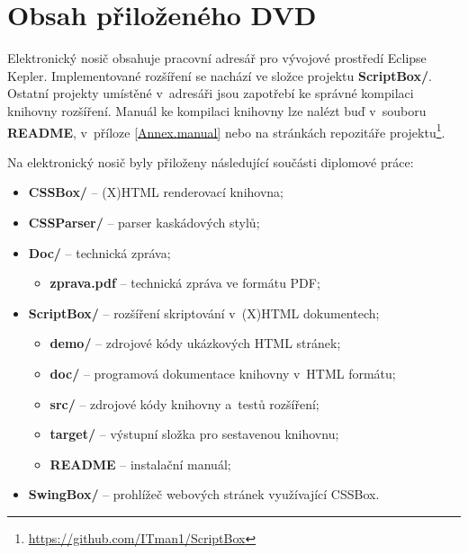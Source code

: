 
\chapter{Obsah přiloženého DVD}
\label{Annex.dvdContent}


Elektronický nosič obsahuje pracovní adresář pro vývojové prostředí Eclipse Kepler. Implementované rozšíření se nachází ve složce projektu \textbf{ScriptBox/}. Ostatní projekty umístěné v~adresáři jsou zapotřebí ke správné kompilaci knihovny rozšíření. Manuál ke kompilaci knihovny lze nalézt buď v~souboru \textbf{README}, v~příloze \ref{Annex.manual} nebo na stránkách repozitáře projektu\footnote{\url{https://github.com/ITman1/ScriptBox}}.

\medskip

\noindent Na elektronický nosič byly přiloženy následující součásti diplomové práce: 
\bigskip

\begin{itemize}
  \item \textbf{CSSBox/} -- (X)HTML renderovací knihovna;
  \item \textbf{CSSParser/} -- parser kaskádových stylů;
  \item \textbf{Doc/} -- technická zpráva;
    \begin{itemize}
      \item \textbf{zprava.pdf} -- technická zpráva ve formátu PDF;
    \end{itemize}
  \item \textbf{ScriptBox/} -- rozšíření skriptování v~(X)HTML dokumentech;
    \begin{itemize}
      \item \textbf{demo/} -- zdrojové kódy ukázkových HTML stránek;
      \item \textbf{doc/} -- programová dokumentace knihovny v~HTML formátu;
      \item \textbf{src/} -- zdrojové kódy knihovny a~testů rozšíření;
      \item \textbf{target/} -- výstupní složka pro sestavenou knihovnu;
      \item \textbf{README} -- instalační manuál;
    \end{itemize}
  \item \textbf{SwingBox/} -- prohlížeč webových stránek využívající CSSBox.
\end{itemize}

